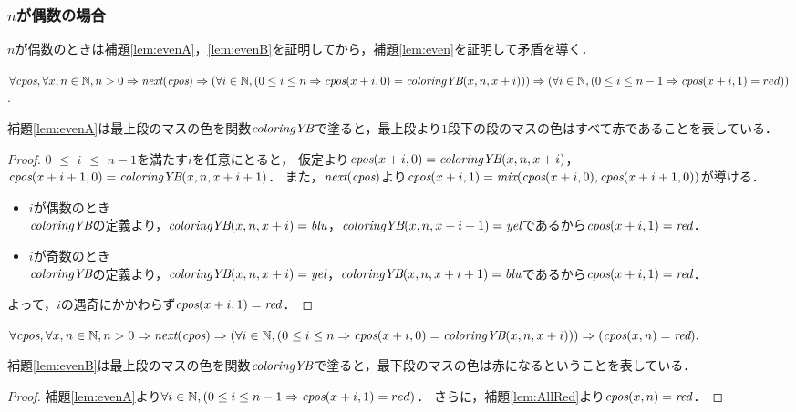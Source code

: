 \subsubsection{$n$が偶数の場合}
$n$が偶数のときは補題\ref{lem:evenA}，\ref{lem:evenB}を証明してから，補題\ref{lem:even}を証明して矛盾を導く．
\begin{lem}[\EvenA] \label{lem:evenA}
  $\forall \textit{cpos}, \forall x, n \in \mathbb{N}, n > 0  \Rightarrow \textit{next}(\textit{cpos}) \Rightarrow 
  (\forall i \in \mathbb{N}, (0 \leq i \leq n \Rightarrow \textit{cpos}(x+i,0) = \textit{coloringYB}(x,n,x+i))) \Rightarrow
  (\forall i \in \mathbb{N}, (0 \leq i \leq n-1 \Rightarrow \textit{cpos}(x+i,1) = red))$.
\end{lem}
補題\ref{lem:evenA}は最上段のマスの色を関数$\textit{coloringYB}$で塗ると，最上段より$1$段下の段のマスの色はすべて赤であることを表している．
\begin{proof}
  $0$ $\leq$ $i$ $\leq$ $n-1$を満たす$i$を任意にとると，
  仮定より$\textit{cpos}(x+i,0) = \textit{coloringYB}(x,n,x+i)$，$\textit{cpos}(x+i+1,0) = \textit{coloringYB}(x,n,x+i+1)$．
  また，$\textit{next}(\textit{cpos})$より$\textit{cpos}(x+i,1) = \textit{mix}(\textit{cpos}(x+i,0),\textit{cpos}(x+i+1,0))$が導ける．
  \begin{itemize}
  \item
    $i$が偶数のとき \\
    $\textit{coloringYB}$の定義より，$\textit{coloringYB}(x,n,x+i)=\textit{blu}$，$\textit{coloringYB}(x,n,x+i+1)=\textit{yel}$であるから$\textit{cpos}(x+i,1)=\textit{red}$．
  \item
    $i$が奇数のとき \\
    $\textit{coloringYB}$の定義より，$\textit{coloringYB}(x,n,x+i)=\textit{yel}$，$\textit{coloringYB}(x,n,x+i+1)=\textit{blu}$であるから$\textit{cpos}(x+i,1)=\textit{red}$．
  \end{itemize}
  よって，$i$の遇奇にかかわらず$\textit{cpos}(x+i,1)=\textit{red}$．
\end{proof}
\begin{lem}[\EvenB] \label{lem:evenB}
  $\forall \textit{cpos}, \forall x, n \in \mathbb{N}, n > 0 \Rightarrow \textit{next}(\textit{cpos}) \Rightarrow 
  (\forall i \in \mathbb{N}, (0 \leq i \leq n \Rightarrow \textit{cpos}(x+i,0) = \textit{coloringYB}(x,n,x+i))) \Rightarrow
  (\textit{cpos}(x,n)=\textit{red}).$
\end{lem}
補題\ref{lem:evenB}は最上段のマスの色を関数$\textit{coloringYB}$で塗ると，最下段のマスの色は赤になるということを表している．
\begin{proof}
  補題\ref{lem:evenA}より$\forall i \in \mathbb{N}, (0 \leq i \leq n-1 \Rightarrow \textit{cpos}(x+i,1) = red)$．
  さらに，補題\ref{lem:AllRed}より$\textit{cpos}(x,n)=\textit{red}$．
\end{proof}

